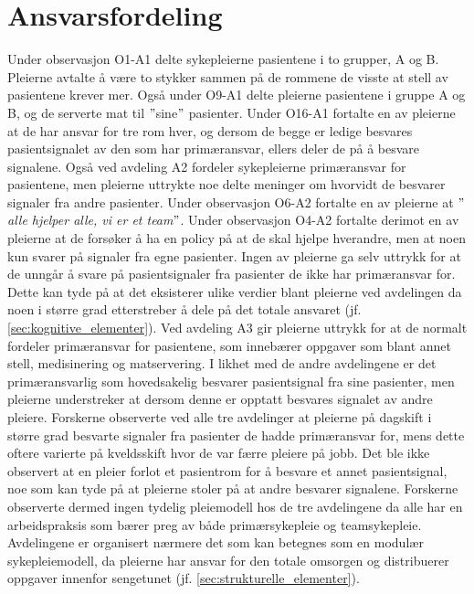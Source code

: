 \section{Ansvarsfordeling}
Under observasjon O1-A1 delte sykepleierne pasientene i to grupper, A og B. Pleierne avtalte å være to stykker sammen på de rommene de visste at stell av pasientene krever mer. Også under O9-A1 delte pleierne pasientene i gruppe A og B, og de serverte mat til $"$sine$"$ pasienter. Under O16-A1 fortalte en av pleierne at de har ansvar for tre rom hver, og dersom de begge er ledige besvares pasientsignalet av den som har primæransvar, ellers deler de på å besvare signalene. Også ved avdeling A2 fordeler sykepleierne primæransvar for pasientene, men pleierne uttrykte noe delte meninger om hvorvidt de besvarer signaler fra andre pasienter. Under observasjon O6-A2 fortalte en av pleierne at \textit{$"$alle hjelper alle, vi er et team$"$}. Under observasjon O4-A2 fortalte derimot en av pleierne at de forsøker å ha en policy på at de skal hjelpe hverandre, men at noen kun svarer på signaler fra egne pasienter. Ingen av pleierne ga selv uttrykk for at de unngår å svare på pasientsignaler fra pasienter de ikke har primæransvar for. Dette kan tyde på at det eksisterer ulike verdier blant pleierne ved avdelingen da noen i større grad etterstreber å dele på det totale ansvaret (jf. \ref{sec:kognitive_elementer}). Ved avdeling A3 gir pleierne uttrykk for at de normalt fordeler primæransvar for pasientene, som innebærer oppgaver som blant annet stell, medisinering og matservering. I likhet med de andre avdelingene er det primæransvarlig som hovedsakelig besvarer pasientsignal fra sine pasienter, men pleierne understreker at dersom denne er opptatt besvares signalet av andre pleiere. Forskerne observerte ved alle tre avdelinger at pleierne på dagskift i større grad besvarte signaler fra pasienter de hadde primæransvar for, mens dette oftere varierte på kveldsskift hvor de var færre pleiere på jobb. Det ble ikke observert at en pleier forlot et pasientrom for å besvare et annet pasientsignal, noe som kan tyde på at pleierne stoler på at andre besvarer signalene. Forskerne observerte dermed ingen tydelig pleiemodell hos de tre avdelingene da alle har en arbeidspraksis som bærer preg av både primærsykepleie og teamsykepleie. Avdelingene er organisert nærmere det som kan betegnes som en modulær sykepleiemodell, da pleierne har ansvar for den totale omsorgen og distribuerer oppgaver innenfor sengetunet (jf. \ref{sec:strukturelle_elementer}). 

